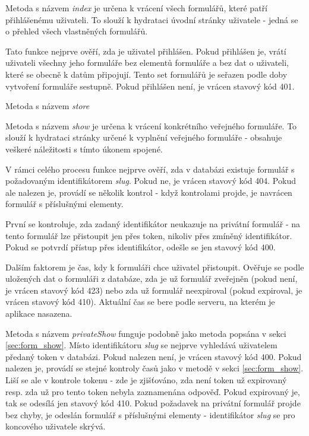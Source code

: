 			Metoda s názvem \textit{index} je určena k vrácení všech formulářů, které patří přihlášenému uživateli. To slouží k hydrataci úvodní stránky uživatele - jedná se o přehled všech vlastněných formulářů. 
			
			Tato funkce nejprve ověří, zda je uživatel přihlášen. Pokud přihlášen je, vrátí uživateli všechny jeho formuláře bez elementů formuláře a bez dat o uživateli, které se obecně k datům připojují. Tento set formulářů je seřazen podle doby vytvoření formuláře sestupně. Pokud přihlášen není, je vrácen stavový kód 401. 
			
			Metoda s názvem \textit{store}
			
			\label{sec:form_show}
			Metoda s názvem \textit{show} je určena k vrácení konkrétního veřejného formuláře. To slouží k hydrataci stránky určené k vyplnění veřejného formuláře - obsahuje veškeré náležitosti s tímto úkonem spojené.
			
			V rámci celého procesu funkce nejprve ověří, zda v databázi existuje formulář s požadovaným identifikátorem \textit{slug}. Pokud ne, je vrácen stavový kód 404. Pokud ale nalezen je, provádí se několik kontrol - když kontrolami projde, je navrácen formulář s příslušnými elementy.
			
			První se kontroluje, zda zadaný identifikátor neukazuje na privátní formulář - na tento formulář lze přistoupit jen přes token, nikoliv přes zmíněný identifikátor. Pokud se potvrdí přístup přes identifikátor, odešle se jen stavový kód 400.
			
			Dalším faktorem je čas, kdy k formuláři chce uživatel přistoupit. Ověřuje se podle uložených dat o formuláři z databáze, zda je už formulář zveřejněn (pokud není, je vrácen stavový kód 423) nebo zda už formulář neexpiroval (pokud expiroval, je vrácen stavový kód 410). Aktuální čas se bere podle serveru, na kterém je aplikace nasazena.
			
			Metoda s názvem \textit{privateShow} funguje podobně jako metoda popsána v sekci \ref{sec:form_show}. Místo identifikátoru \textit{slug} se nejprve vyhledává uživatelem předaný token v databázi. Pokud nalezen není, je vrácen stavový kód 400. Pokud nalezen je, provádí se stejné kontroly časů jako v metodě v sekci \ref{sec:form_show}. Liší se ale v kontrole tokenu - zde je zjišťováno, zda není token už expirovaný resp. zda už pro tento token nebyla zaznamenána odpověď. Pokud expirovaný je, tak se odesílá jen stavový kód 410. Pokud požadavek na privátní formulář projde bez chyby, je odeslán formulář s příslušnými elementy - identifikátor \textit{slug} se pro koncového uživatele skrývá.
			
